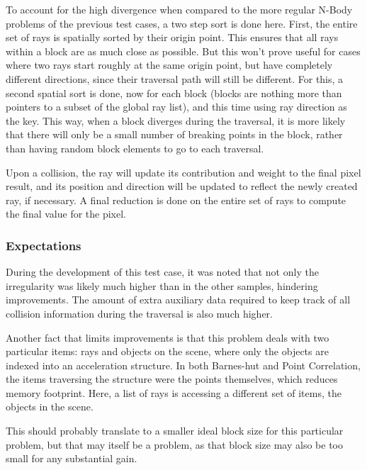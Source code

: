To account for the high divergence when compared to the more regular N-Body problems of the previous test cases, a two step sort is done here. First, the entire set of rays is spatially sorted by their origin point. This ensures that all rays within a block are as much close as possible. But this won't prove useful for cases where two rays start roughly at the same origin point, but have completely different directions, since their traversal path will still be different. For this, a second spatial sort is done, now for each block (blocks are nothing more than pointers to a subset of the global ray list), and this time using ray direction as the key.
This way, when a block diverges during the traversal, it is more likely that there will only be a small number of breaking points in the block, rather than having random block elements to go to each traversal.

Upon a collision, the ray will update its contribution and weight to the final pixel result, and its position and direction will be updated to reflect the newly created ray, if necessary. A final reduction is done on the entire set of rays to compute the final value for the pixel.

\subsubsection{Expectations}

During the development of this test case, it was noted that not only the irregularity was likely much higher than in the other samples, hindering improvements. The amount of extra auxiliary data required to keep track of all collision information during the traversal is also much higher.

Another fact that limits improvements is that this problem deals with two particular items: rays and objects on the scene, where only the objects are indexed into an acceleration structure. In both Barnes-hut and Point Correlation, the items traversing the structure were the points themselves, which reduces memory footprint. Here, a list of rays is accessing a different set of items, the objects in the scene.

This should probably translate to a smaller ideal block size for this particular problem, but that may itself be a problem, as that block size may also be too small for any substantial gain. 


